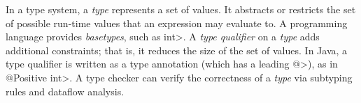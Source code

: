 % 
% 
% 
% 




In a type system,
a \textit{type} represents a set of values.  It abstracts or restricts the
set of possible run-time values that an expression may evaluate to.
A programming language provides \emph{basetypes}, such as \<int>.
A \textit{type qualifier} on a \textit{type} adds additional constraints;
that is, it reduces the size of the set of values.
In Java, a type qualifier is written as a type annotation (which has a leading \<@>), as in
\<@Positive int>.
A type checker can verify the correctness of a \textit{type} via subtyping
rules and dataflow analysis.

